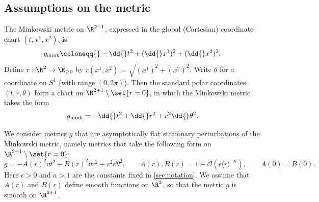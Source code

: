 \documentclass[10pt, reqno]{amsart}
\begin{document}
\subsection{Assumptions on the metric}
\label{sec:metric-assumptions}
The Minkowski metric on \(\R^{2 + 1}\), expressed in the global (Cartesian)
coordinate chart \((t,x^1,x^2)\), is
\begin{equation}
g_{\textnormal{mink}} \coloneqq{} -\dd{}t^2 + (\dd{}x^1)^2 + (\dd{}x^2)^2.
\end{equation}
Define \(r :\R^{2}\to \R_{\ge 0}\) by \(r(x^1,x^2)\coloneqq{}\sqrt{(x^1)^2 + (x^2)^2}\). Write
\(\theta{}\) for a coordinate on \(S^1\) (with range \((0,2\pi{})\)). Then the
standard polar coordinates \((t,r,\theta{})\) form a chart on \(\R^{2 +
1}\setminus \set{r=0}\), in which the Minkowski metric takes the form
\begin{equation}
g_{\textnormal{mink}} = -\dd{}t^2 + \dd{}r^2 + r^2\dd{}\theta^2.
\end{equation}

We consider metrics \(g\) that are asymptotically flat stationary perturbations
of the Minkowski metric, namely metrics that take the following form on \(\R^{2 + 1}\setminus \set{r=0}\):
\begin{equation}\label{metric}
g = -A(r)^2\dd{}t^2 + B(r)^2\dd{}r^2 + r^2\dd{}\theta^2,\qquad A(r),B(r) = 1 + \mathcal{O}(\epsilon{}\langle{}r\rangle^{-a}),\qquad A(0) = B(0).
\end{equation}
Here \(\epsilon{}>0\) and \(a{} > 1\) are the constants fixed in \cref{sec:notation}.
We assume that \(A(r)\) and \(B(r)\) define smooth functions on \(\R^2\), so that
the metric \(g\) is smooth on \(\R^{2 + 1}\).
\end{document}
